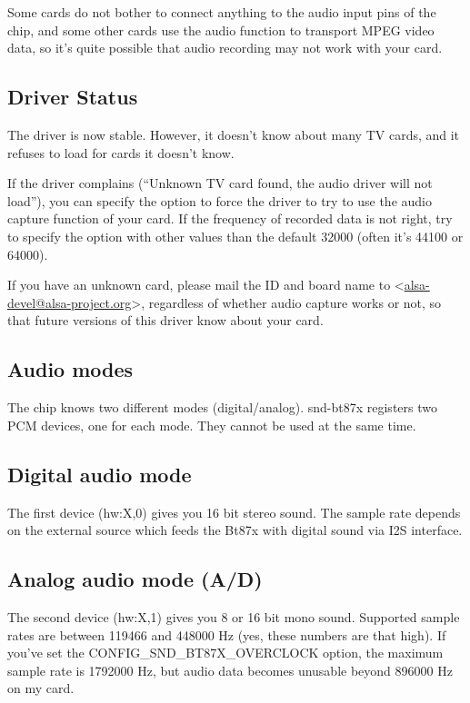\documentclass[a4paper,8pt,english]{sphinxmanual}
\begin{document}
Some cards do not bother to connect anything to the audio input pins of
the chip, and some other cards use the audio function to transport MPEG
video data, so it's quite possible that audio recording may not work
with your card.


\subsection{Driver Status}
\label{sound/cards/bt87x:driver-status}
The driver is now stable.  However, it doesn't know about many TV cards,
and it refuses to load for cards it doesn't know.

If the driver complains (``Unknown TV card found, the audio driver will
not load''), you can specify the  option to force the driver to
try to use the audio capture function of your card.  If the frequency of
recorded data is not right, try to specify the  option with
other values than the default 32000 (often it's 44100 or 64000).

If you have an unknown card, please mail the ID and board name to
\textless{}\href{mailto:alsa-devel@alsa-project.org}{alsa-devel@alsa-project.org}\textgreater{}, regardless of whether audio capture works
or not, so that future versions of this driver know about your card.


\subsection{Audio modes}
\label{sound/cards/bt87x:audio-modes}
The chip knows two different modes (digital/analog).  snd-bt87x
registers two PCM devices, one for each mode.  They cannot be used at
the same time.


\subsection{Digital audio mode}
\label{sound/cards/bt87x:digital-audio-mode}
The first device (hw:X,0) gives you 16 bit stereo sound.  The sample
rate depends on the external source which feeds the Bt87x with digital
sound via I2S interface.


\subsection{Analog audio mode (A/D)}
\label{sound/cards/bt87x:analog-audio-mode-a-d}
The second device (hw:X,1) gives you 8 or 16 bit mono sound.  Supported
sample rates are between 119466 and 448000 Hz (yes, these numbers are
that high).  If you've set the CONFIG\_SND\_BT87X\_OVERCLOCK option, the
maximum sample rate is 1792000 Hz, but audio data becomes unusable
beyond 896000 Hz on my card.
\end{document}
